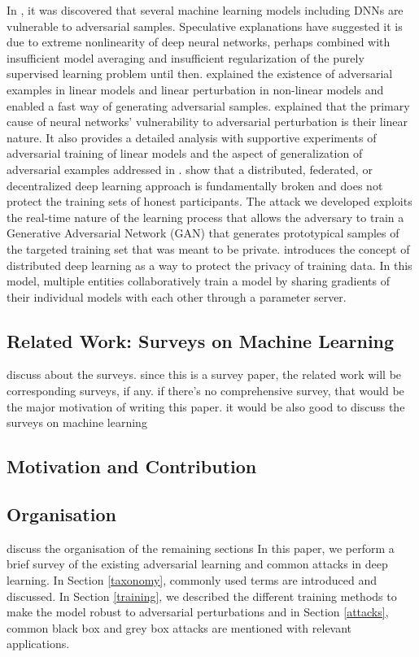 \documentclass{article}
\newcommand{\ach}[1]{{\color{red}#1}}
\begin{document}
In \cite{szegedy2013intriguing}, it was discovered that several machine learning models including DNNs are vulnerable to adversarial samples. Speculative explanations have suggested it is due to extreme nonlinearity of deep neural networks, perhaps combined with insufficient model averaging and insufficient regularization of the purely supervised
learning problem until then. \cite{szegedy2013intriguing} explained the existence of adversarial examples in linear models and linear perturbation in non-linear models and enabled a fast way of generating adversarial samples. \cite{goodfellow2014explaining} explained that the  primary cause of neural networks’ vulnerability to adversarial perturbation is their linear nature. It also provides a detailed analysis with supportive experiments of adversarial training of linear models and the aspect of generalization of adversarial examples addressed in \cite{papernot2016transferability}. \cite{hitaj2017deep} show that a distributed, federated, or decentralized deep learning approach is fundamentally broken and does not protect the training sets of honest participants. The attack we developed exploits the real-time nature of the learning process that allows the adversary to train a Generative Adversarial Network (GAN) that generates prototypical samples of the targeted training set that was meant to be private. \cite{abadi2016deep} introduces the concept of distributed deep learning as a way to protect the privacy of training data. In this model, multiple entities collaboratively train a model by sharing gradients of their individual models with each other through a parameter server.

\subsection{Related Work: Surveys on Machine Learning}
\ach{discuss about the surveys. since this is a survey paper, the related work will be corresponding surveys, if any. if there's no comprehensive survey, that would be the major motivation of writing this paper. it would be also good to discuss the surveys on machine learning}
\subsection{Motivation and Contribution}

\subsection*{Organisation}
\ach{discuss the organisation of the remaining sections}
In this paper, we perform a brief survey of the existing adversarial learning and common attacks in deep learning. In Section \ref{taxonomy}, commonly used terms are introduced and discussed. In Section \ref{training}, we described the different training methods to make the model robust to adversarial perturbations and in Section \ref{attacks}, common black box and grey box attacks are mentioned with relevant applications.
\end{document}
